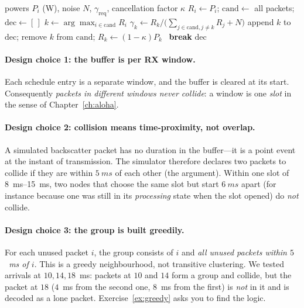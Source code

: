 \begin{algorithm}[t]
\caption{SIC as implemented ()}
\label{alg:sic}
\begin{algorithmic}[1]
\Require powers $P_i$ (W), noise $N$, $\gamma_{\mathrm{req}}$, cancellation factor $\kappa$
\State $R_i\gets P_i$; $\mathrm{cand}\gets$ all packets; $\mathrm{dec}\gets[\,]$
  \State $k\gets\arg\max_{i\in\mathrm{cand}}R_i$
  \State $\gamma_k\gets R_k/\big(\sum_{j\in\mathrm{cand},j\ne k}R_j+N\big)$
     \State append $k$ to $\mathrm{dec}$; remove $k$ from $\mathrm{cand}$; $R_k\gets(1-\kappa)P_k$ 
  \Else \ \textbf{break}
  \EndIf
\EndWhile
\State \Return $\mathrm{dec}$
\end{algorithmic}
\end{algorithm}

\paragraph{Design choice 1: the buffer is per RX window.}
Each  schedule entry is a separate window, and the buffer is cleared at its start. Consequently \emph{packets in different windows never collide}: a window is one \emph{slot} in the sense of Chapter~\ref{ch:aloha}.

\paragraph{Design choice 2: collision means time-proximity, not overlap.}
A simulated backscatter packet has no duration in the buffer---it is a point event at the instant of transmission. The simulator
therefore declares two packets to collide if they are within $\SI{5}{ms}$ of each other (the  argument).
Within one slot of \SIrange{8}{15}{ms}, two nodes that choose the same slot but start $\SI{6}{ms}$ apart (for instance
because one was still in its \emph{processing} state when the slot opened) do \emph{not} collide.

\paragraph{Design choice 3: the group is built greedily.}
For each unused packet $i$, the group consists of $i$ and \emph{all unused packets within $5$~ms of $i$}. This is a greedy neighbourhood, not transitive clustering.
We tested arrivals at $10,14,18$~ms: packets at $10$ and $14$ form a group and collide, but the packet at $18$ ($4$~ms from the second one, $8$~ms from the first) is \emph{not} in it and is decoded
as a lone packet. Exercise~\ref{ex:greedy} asks you to find the logic.

